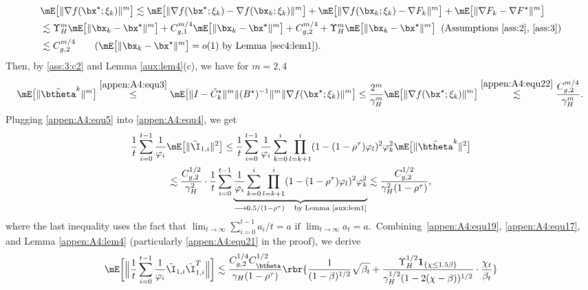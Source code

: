 \begin{align}\label{appen:A4:equ22}
&\mE\big[\|\nabla f(\bx^\star; \xi_k)\|^m\big] \lesssim \mE\big[\|\nabla f(\bx^\star;\xi_k)-\nabla f(\bx_k;\xi_k)\|^m\big] + \mE\big[\|\nabla f(\bx_k;\xi_k)-\nabla F_k\|^m\big] + \mE\big[\|\nabla F_k - \nabla F^\star\|^m\big]\nonumber\\
&\lesssim \Upsilon_H^m\mE\big[\|\bx_k-\bx^\star\|^m\big] + C_{g,1}^{m/4}\mE\big[\|\bx_k-\bx^\star\|^m\big] + C_{g,2}^{m/4} + \Upsilon_H^m\mE\big[\|\bx_k-\bx^\star\|^m\big]\;\;(\text{Assumptions \ref{ass:2}, \ref{ass:3}})\nonumber\\
&\lesssim C_{g,2}^{m/4}\quad\quad (\mE\big[\|\bx_k-\bx^\star\|^m\big]=o(1) \text{ by Lemma \ref{sec4:lem1}}).
\end{align}
Then, by \eqref{ass:3:c2} and Lemma \ref{aux:lem4}(c), we have for $m=2,4$
\begin{equation}\label{appen:A4:equ5}
\hskip-0.1cm \mE\big[\|\tilde{\btheta}^k\|^m\big] \stackrel{\eqref{appen:A4:equ3}}{\leq} \mE\big[\|I- \tilde{C}_k^\star\|^m\|(B^{\star})^{-1}\|^m\|\nabla f(\bx^\star;\xi_k)\|^m\big] \leq\frac{2^m}{\gamma_H^m}\mE\big[\|\nabla f(\bx^\star;\xi_k)\|^m\big] \stackrel{\eqref{appen:A4:equ22}}{\lesssim} \frac{C_{g,2}^{m/4}}{\gamma_H^m}.
\end{equation}
Plugging \eqref{appen:A4:equ5}  into \eqref{appen:A4:equ4}, we get
\begin{multline}\label{appen:A4:equ17}
\frac{1}{t}\sum_{i=0}^{t-1} \frac{1}{\varphi_i} \mE\big[\|\tilde{\I}_{1,i}\|^2\big] \leq \frac{1}{t}\sum_{i=0}^{t-1} \frac{1}{\varphi_i}\sum_{k=0}^i \prod_{l=k+1}^i (1-(1-\rho^{\tau}) \varphi_l)^2\varphi_k^2 \mE\big[\|\tilde{\btheta}^k\|^2\big]\\
\lesssim \frac{C_{g,2}^{1/2}}{\gamma_H^2}\cdot\frac{1}{t}\sum_{i=0}^{t-1}\underbrace{\frac{1}{\varphi_i}\sum_{k=0}^{i}\prod_{l=k+1}^i(1-(1-\rho^{\tau})\varphi_l)^2 \varphi_k^2}_{\longrightarrow 0.5/(1-\rho^\tau)\quad\text{by Lemma \ref{aux:lem1}}}\lesssim \frac{C_{g,2}^{1/2}}{\gamma_H^2(1-\rho^\tau)},
\end{multline}
where the last inequality uses the fact that $\lim_{t\rightarrow\infty}\sum_{i=0}^{t-1} a_i/t = a \text{ if } \lim_{t\rightarrow\infty}a_t=a$.~\mbox{Combining}~\eqref{appen:A4:equ19}, \eqref{appen:A4:equ17}, and Lemma \ref{appen:A4:lem4} (particularly \eqref{appen:A4:equ21} in the proof), we derive
\begin{equation}\label{appen:A4:equ25}
\mE\bigg[\Big\|\frac{1}{t}\sum_{i=0}^{t-1}\frac{1}{\varphi_i}\tilde{\I}_{1,i}\hat{\I}_{1,i}^T\Big\|\bigg] \lesssim \frac{C_{g,2}^{1/4}C_{\hat{\btheta}}^{1/2}}{\gamma_H(1-\rho^\tau)} \rbr{\frac{1}{(1-\beta)^{1/2}}\sqrt{\beta_t} + \frac{\Upsilon_H^{1/2}\mathbf{1}_{\{\chi\leq 1.5\beta\}}}{\gamma_H^{1/2}(1-2(\chi-\beta))^{1/2}}\cdot\frac{\chi_t}{\beta_t}}
\end{equation}
